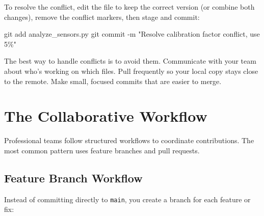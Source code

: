\documentclass[
  letterpaper,
  DIV=11,
  numbers=noendperiod]{scrreprt}
\newenvironment{Shaded}{\begin{snugshade}}{\end{snugshade}}
\newcommand{\AttributeTok}[1]{\textcolor[rgb]{0.40,0.45,0.13}{#1}}
\newcommand{\FunctionTok}[1]{\textcolor[rgb]{0.28,0.35,0.67}{#1}}
\newcommand{\NormalTok}[1]{\textcolor[rgb]{0.00,0.23,0.31}{#1}}
\newcommand{\StringTok}[1]{\textcolor[rgb]{0.13,0.47,0.30}{#1}}
\begin{document}
To resolve the conflict, edit the file to keep the correct version (or
combine both changes), remove the conflict markers, then stage and
commit:

\begin{codelisting}

\caption{\texttt{terminal}}

\begin{Shaded}
\begin{Highlighting}[]
\FunctionTok{git}\NormalTok{ add analyze\_sensors.py}
\FunctionTok{git}\NormalTok{ commit }\AttributeTok{{-}m} \StringTok{"Resolve calibration factor conflict, use 5\%"}
\end{Highlighting}
\end{Shaded}

\end{codelisting}

\begin{tcolorbox}[enhanced jigsaw, opacitybacktitle=0.6, arc=.35mm, colback=white, bottomtitle=1mm, opacityback=0, toprule=.15mm, left=2mm, colbacktitle=quarto-callout-tip-color!10!white, breakable, coltitle=black, toptitle=1mm, colframe=quarto-callout-tip-color-frame, bottomrule=.15mm, titlerule=0mm, title=\textcolor{quarto-callout-tip-color}{\faLightbulb}\hspace{0.5em}{Avoiding Conflicts}, rightrule=.15mm, leftrule=.75mm]

The best way to handle conflicts is to avoid them. Communicate with your
team about who's working on which files. Pull frequently so your local
copy stays close to the remote. Make small, focused commits that are
easier to merge.

\end{tcolorbox}

\section{The Collaborative Workflow}\label{the-collaborative-workflow}

Professional teams follow structured workflows to coordinate
contributions. The most common pattern uses feature branches and pull
requests.

\subsection{Feature Branch Workflow}\label{feature-branch-workflow}

Instead of committing directly to \texttt{main}, you create a branch for
each feature or fix:
\end{document}

